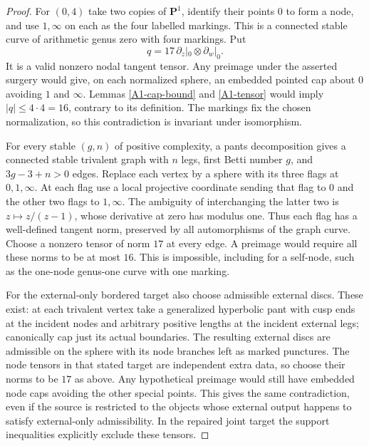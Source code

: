 \begin{proof}
For $(0,4)$ take two copies of $\mathbf P^1$, identify their points $0$ to form a node, and use $1,\infty$ on each as the four labelled markings. This is a connected stable curve of arithmetic genus zero with four markings. Put
\[
q=17\,\partial_z|_0\otimes\partial_w|_0.
\]
It is a valid nonzero nodal tangent tensor. Any preimage under the asserted surgery would give, on each normalized sphere, an embedded pointed cap about $0$ avoiding $1$ and $\infty$. Lemmas \ref{A1-cap-bound} and \ref{A1-tensor} would imply $|q|\leq4\cdot4=16$, contrary to its definition. The markings fix the chosen normalization, so this contradiction is invariant under isomorphism.

For every stable $(g,n)$ of positive complexity, a pants decomposition gives a connected stable trivalent graph with $n$ legs, first Betti number $g$, and $3g-3+n>0$ edges. Replace each vertex by a sphere with its three flags at $0,1,\infty$. At each flag use a local projective coordinate sending that flag to $0$ and the other two flags to $1,\infty$. The ambiguity of interchanging the latter two is $z\mapsto z/(z-1)$, whose derivative at zero has modulus one. Thus each flag has a well-defined tangent norm, preserved by all automorphisms of the graph curve. Choose a nonzero tensor of norm $17$ at every edge. A preimage would require all these norms to be at most $16$. This is impossible, including for a self-node, such as the one-node genus-one curve with one marking.

For the external-only bordered target also choose admissible external
discs. These exist: at each trivalent vertex take a generalized
hyperbolic pant with cusp ends at the incident nodes and arbitrary
positive lengths at the incident external legs; canonically cap just
its actual boundaries. The resulting external discs are admissible
on the sphere with its node branches left as marked punctures.
The node tensors in that stated target are independent extra data,
so choose their norms to be $17$ as above. Any hypothetical preimage
would still have embedded node caps avoiding the other special
points. This gives the same contradiction, even if the source is
restricted to the objects whose external output happens to satisfy
external-only admissibility. In the repaired joint target the
support inequalities explicitly exclude these tensors.
\end{proof}

